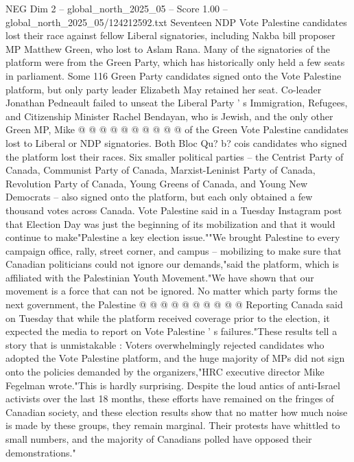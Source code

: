 \begin{textsample}{NEG Dim 2 – global\_north\_2025\_05 – Score 1.00 – global\_north\_2025\_05/124212592.txt}
Seventeen NDP Vote Palestine candidates lost their race against fellow Liberal signatories, including Nakba bill proposer MP Matthew Green, who lost to Aslam Rana.
Many of the signatories of the platform were from the Green Party, which has historically only held a few seats in parliament.
Some 116 Green Party candidates signed onto the Vote Palestine platform, but only party leader Elizabeth May retained her seat.
Co-leader Jonathan Pedneault failed to unseat the Liberal Party ' s Immigration, Refugees, and Citizenship Minister Rachel Bendayan, who is Jewish, and the only other Green MP, Mike @ @ @ @ @ @ @ @ @ @ of the Green Vote Palestine candidates lost to Liberal or NDP signatories.
Both Bloc Qu? b? cois candidates who signed the platform lost their races.
Six smaller political parties -- the Centrist Party of Canada, Communist Party of Canada, Marxist-Leninist Party of Canada, Revolution Party of Canada, Young Greens of Canada, and Young New Democrats -- also signed onto the platform, but each only obtained a few thousand votes across Canada.
Vote Palestine said in a Tuesday Instagram post that Election Day was just the beginning of its mobilization and that it would continue to make"Palestine a key election issue.""We brought Palestine to every campaign office, rally, street corner, and campus -- mobilizing to make sure that Canadian politicians could not ignore our demands,"said the platform, which is affiliated with the Palestinian Youth Movement."We have shown that our movement is a force that can not be ignored.
No matter which party forms the next government, the Palestine @ @ @ @ @ @ @ @ @ @ Reporting Canada said on Tuesday that while the platform received coverage prior to the election, it expected the media to report on Vote Palestine ' s failures."These results tell a story that is unmistakable : Voters overwhelmingly rejected candidates who adopted the Vote Palestine platform, and the huge majority of MPs did not sign onto the policies demanded by the organizers,"HRC executive director Mike Fegelman wrote."This is hardly surprising.
Despite the loud antics of anti-Israel activists over the last 18 months, these efforts have remained on the fringes of Canadian society, and these election results show that no matter how much noise is made by these groups, they remain marginal.
Their protests have whittled to small numbers, and the majority of Canadians polled have opposed their demonstrations."

\end{textsample}

